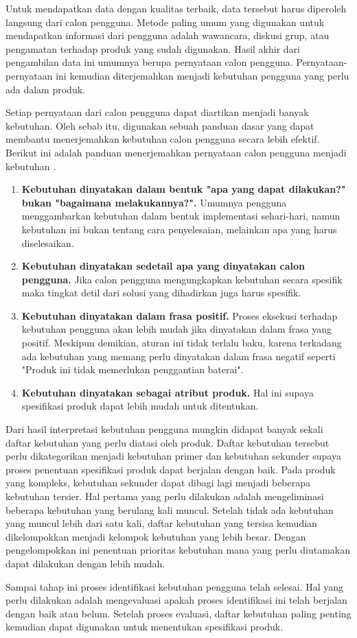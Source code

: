 Untuk mendapatkan data dengan kualitas terbaik, data tersebut harus diperoleh langsung dari calon pengguna. Metode paling umum yang digunakan untuk mendapatkan informasi dari pengguna adalah wawancara, diskusi grup, atau pengamatan terhadap produk yang sudah digunakan. Hasil akhir dari pengambilan data ini umumnya berupa pernyataan calon pengguna. Pernyataan-pernyataan ini kemudian diterjemahkan menjadi kebutuhan pengguna yang perlu ada dalam produk. \par 
Setiap pernyataan dari calon pengguna dapat diartikan menjadi banyak kebutuhan. Oleh sebab itu, digunakan sebuah panduan dasar yang dapat membantu menerjemahkan kebutuhan calon pengguna secara lebih efektif. Berikut ini adalah panduan menerjemahkan pernyataan calon pengguna menjadi kebutuhan \cite{bukuUlrich}.
\begin{enumerate}
    \item \textbf{Kebutuhan dinyatakan dalam bentuk "apa yang dapat dilakukan?" bukan "bagaimana melakukannya?".} Umumnya pengguna menggambarkan kebutuhan dalam bentuk implementasi sehari-hari, namun kebutuhan ini bukan tentang cara penyelesaian, melainkan apa yang harus diselesaikan.
    \item \textbf{Kebutuhan dinyatakan sedetail apa yang dinyatakan calon pengguna.} Jika calon pengguna mengungkapkan kebutuhan secara spesifik maka tingkat detil dari solusi yang dihadirkan juga harus spesifik.
    \item \textbf{Kebutuhan dinyatakan dalam frasa positif.} Proses eksekusi terhadap kebutuhan pengguna akan lebih mudah jika dinyatakan dalam frasa yang positif. Meskipun demikian, aturan ini tidak terlalu baku, karena terkadang ada kebutuhan yang memang perlu dinyatakan dalam frasa negatif seperti "Produk ini tidak memerlukan penggantian baterai".
    \item \textbf{Kebutuhan dinyatakan sebagai atribut produk.} Hal ini supaya spesifikasi produk dapat lebih mudah untuk ditentukan.
\end{enumerate}

Dari hasil interpretasi kebutuhan pengguna mungkin didapat banyak sekali daftar kebutuhan yang perlu diatasi oleh produk. Daftar kebutuhan tersebut perlu dikategorikan menjadi kebutuhan primer dan kebutuhan sekunder supaya proses penentuan spesifikasi produk dapat berjalan dengan baik. Pada produk yang kompleks, kebutuhan sekunder dapat dibagi lagi menjadi beberapa kebutuhan tersier. Hal pertama yang perlu dilakukan adalah mengeliminasi beberapa kebutuhan yang berulang kali muncul. Setelah tidak ada kebutuhan yang muncul lebih dari satu kali, daftar kebutuhan yang tersisa kemudian dikelompokkan menjadi kelompok kebutuhan yang lebih besar. Dengan pengelompokkan ini penentuan prioritas kebutuhan mana yang perlu diutamakan dapat dilakukan dengan lebih mudah. \par 
Sampai tahap ini proses identifikasi kebutuhan pengguna telah selesai. Hal yang perlu dilakukan adalah mengevaluasi apakah proses identifikasi ini telah berjalan dengan baik atau belum. Setelah proses evaluasi, daftar kebutuhan paling penting kemudian dapat digunakan untuk menentukan spesifikasi produk. \par 

